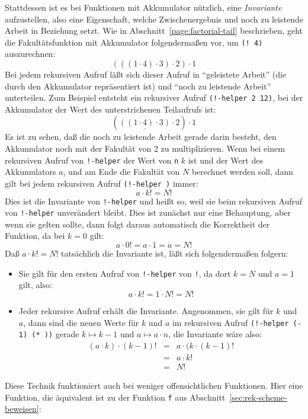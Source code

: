 Stattdessen ist es bei Funktionen mit Akkumulator nützlich, eine
\textit{Invariante} aufzustellen, also eine
Eigenschaft, welche Zwischenergebnis und noch zu leistende Arbeit in
Beziehung setzt.  Wie in Abschnitt~\ref{page:factorial-tail}
beschrieben, geht die Fakultätsfunktion mit Akkumulator folgendermaßen
vor, um \texttt{(! 4)} auszurechnen:
%
\begin{displaymath}
  (((1 \cdot 4)\cdot 3)\cdot 2)\cdot 1
\end{displaymath}
%
Bei jedem rekursiven Aufruf läßt sich dieser Aufruf in "`geleistete
Arbeit"' (die durch den Akkumulator repräsentiert ist) und "`noch zu
leistende Arbeit"' unterteilen.  Zum Beispiel entsteht ein rekursiver
Aufruf \texttt{(!-helper 2 12)}, bei der Akkumulator der Wert des
unterstrichenen Teilaufrufs ist:
%
\begin{displaymath}
  (\underline{((1 \cdot 4)\cdot 3)}\cdot 2)\cdot 1
\end{displaymath}
%
Es ist zu sehen, daß die noch zu leistende Arbeit gerade darin
besteht, den Akkumulator noch mit der Fakultät von 2 zu
multiplizieren.  Wenn bei einem rekursiven Aufruf von \texttt{!-helper} der
Wert von \texttt{n} $k$ ist und der Wert des Akkumulators $a$, und am
Ende die Fakultät von $N$ berechnet werden soll, dann gilt bei jedem
rekursiven Aufruf \texttt{(!-helper  )} immer:
%
\begin{displaymath}
  a \cdot k! = N!
\end{displaymath}
%
Dies ist die Invariante von \texttt{!-helper} und heißt so, weil sie beim
rekursiven Aufruf von \texttt{!-helper} unverändert bleibt.  Dies
ist zunächst nur eine Behauptung, aber wenn sie gelten sollte, dann
folgt daraus automatisch die Korrektheit der Funktion, da bei $k=0$
gilt:
%
\begin{displaymath}
  a \cdot 0! = a \cdot 1 = a = N!
\end{displaymath}
%
Daß $a \cdot k! = N!$ tatsächlich die Invariante ist, läßt sich
folgendermaßen folgern:
%
\begin{itemize}
\item Sie gilt für den ersten Aufruf von \texttt{!-helper} von
  \texttt{!}, da dort $k=N$ und $a=1$ gilt, also:
  \begin{displaymath}
    a \cdot k! = 1 \cdot N! = N!
  \end{displaymath}
\item Jeder rekursive Aufruf erhält die Invariante.  Angenommen, sie
  gilt für $k$ und $a$, dann sind die neuen Werte für $k$ und $a$ im
  rekursiven Aufruf \texttt{(!-helper (-  1) (*  ))} gerade
  $k\mapsto k-1$ und $a \mapsto a\cdot n$, die Invariante wäre also:
  \begin{eqnarray*}
    (a \cdot k) \cdot (k-1)! &=& a \cdot (k \cdot (k-1)!\\
    &=& a\cdot k!\\
    &=& N!
  \end{eqnarray*}
\end{itemize}
%
Diese Technik funktioniert auch bei weniger offensichtlichen
Funktionen.  Hier eine Funktion, die äquivalent ist zu der Funktion
\texttt{f} aus Abschnitt~\ref{sec:rek-scheme-beweisen}:


